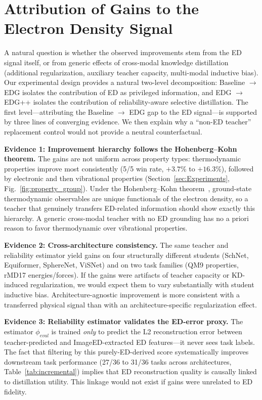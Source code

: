 \section{Attribution of Gains to the Electron Density Signal}
\label{sec:appendix_contribution}

A natural question is whether the observed improvements stem from the ED signal itself, or from generic effects of cross-modal knowledge distillation (additional regularization, auxiliary teacher capacity, multi-modal inductive bias). Our experimental design provides a natural two-level decomposition: Baseline $\to$ EDG isolates the contribution of ED as privileged information, and EDG $\to$ EDG++ isolates the contribution of reliability-aware selective distillation. The first level---attributing the Baseline $\to$ EDG gap to the ED signal---is supported by three lines of converging evidence. We then explain why a ``non-ED teacher'' replacement control would not provide a neutral counterfactual.

\textbf{Evidence 1: Improvement hierarchy follows the Hohenberg--Kohn theorem.} The gains are not uniform across property types: thermodynamic properties improve most consistently (5/5 win rate, $+3.7$\% to $+16.3$\%), followed by electronic and then vibrational properties (Section~\ref{sec:Experiments}, Fig.~\ref{fig:property_group}). Under the Hohenberg--Kohn theorem~\cite{hohenberg1964inhomogeneous}, ground-state thermodynamic observables are unique functionals of the electron density, so a teacher that genuinely transfers ED-related information should show exactly this hierarchy. A generic cross-modal teacher with no ED grounding has no a priori reason to favor thermodynamic over vibrational properties.

\textbf{Evidence 2: Cross-architecture consistency.} The same teacher and reliability estimator yield gains on four structurally different students (SchNet, Equiformer, SphereNet, ViSNet) and on two task families (QM9 properties, rMD17 energies/forces). If the gains were artifacts of teacher capacity or KD-induced regularization, we would expect them to vary substantially with student inductive bias. Architecture-agnostic improvement is more consistent with a transferred physical signal than with an architecture-specific regularization effect.

\textbf{Evidence 3: Reliability estimator validates the ED-error proxy.} The estimator $\phi_{eval}$ is trained \emph{only} to predict the L2 reconstruction error between teacher-predicted and ImageED-extracted ED features---it never sees task labels. The fact that filtering by this purely-ED-derived score systematically improves downstream task performance (27/36 to 31/36 tasks across architectures, Table~\ref{tab:incremental}) implies that ED reconstruction quality is causally linked to distillation utility. This linkage would not exist if gains were unrelated to ED fidelity.


